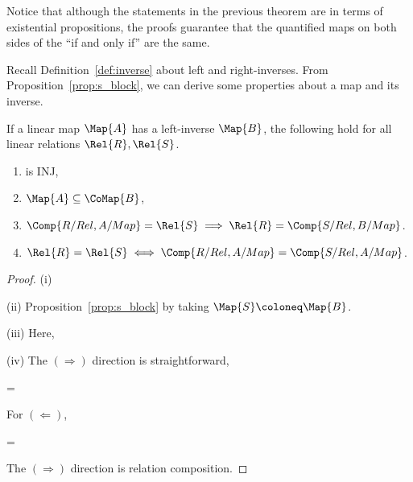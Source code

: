 \documentclass[manyauthors]{fundam}
\begin{document}
\begin{remark}
Notice that although the statements in the previous theorem
are in terms of existential propositions,
the proofs guarantee that the quantified maps
on both sides of the ``if and only if'' are the same.
\end{remark}

Recall Definition~\ref{def:inverse} about left and right-inverses.
From Proposition~\ref{prop:s_block}, we can derive some properties about a map and its inverse.
\begin{proposition}
\label{thm:prop_linverse}
If a linear map $\Map{A}$ has a left-inverse $\Map{B}$, the following hold for all linear relations $\Rel{R}, \Rel{S}$.
\begin{enumerate}
    \item[(i)]  is INJ,
    \item[(ii)] $\Map{A} \subseteq \CoMap{B}$,
    \item[(iii)] $\Comp{R/Rel, A/Map} = \Rel{S} \implies \Rel{R} = \Comp{S/Rel, B/Map}$.
    \item[(iv)] $\Rel{R} = \Rel{S} \iff \Comp{R/Rel, A/Map} = \Comp{S/Rel, A/Map}$.
\end{enumerate}
\end{proposition}
\begin{proof} \quad

(i)
\begin{hcalculation}[\subseteq]{}
\end{hcalculation}

(ii) Proposition~\ref{prop:s_block} by taking $\Map{S} \coloneq \Map{B}$.

(iii) Here,
\begin{hcalculation}{}
\end{hcalculation}

(iv) The $(\Rightarrow)$ direction is straightforward,
\begin{hcalculation}[\implies]{ = }
\end{hcalculation}

For $(\Leftarrow)$,
\begin{hcalculation}[\implies]{ = }
\end{hcalculation}


The $(\Rightarrow)$ direction is relation composition.
\end{proof}
\end{document}

